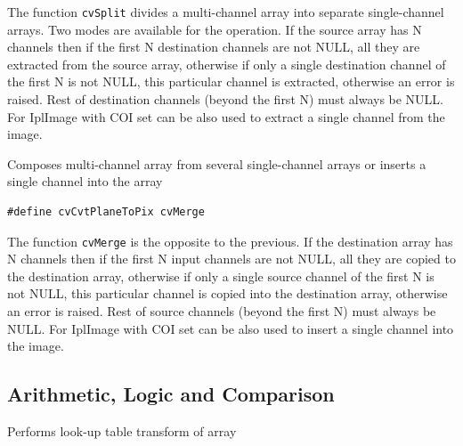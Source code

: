The function \texttt{cvSplit} divides a multi-channel array into separate
single-channel arrays. Two modes are available for the operation. If the
source array has N channels then if the first N destination channels
are not NULL, all they are extracted from the source array, otherwise
if only a single destination channel of the first N is not NULL, this
particular channel is extracted, otherwise an error is raised. Rest
of destination channels (beyond the first N) must always be NULL. For
IplImage  with COI set can be also used to extract a single
channel from the image.


\label{Merge}

Composes multi-channel array from several single-channel arrays or inserts a single channel into the array


\begin{lstlisting}
#define cvCvtPlaneToPix cvMerge
\end{lstlisting}

\begin{description}
\end{description}

The function \texttt{cvMerge} is the opposite to the previous. If the destination array has N channels then if the first N input channels are not NULL, all they are copied to the destination array, otherwise if only a single source channel of the first N is not NULL, this particular channel is copied into the destination array, otherwise an error is raised. Rest of source channels (beyond the first N) must always be NULL. For IplImage  with COI set can be also used to insert a single channel into the image.


\subsection{Arithmetic, Logic and Comparison}

\label{LUT}

Performs look-up table transform of array


